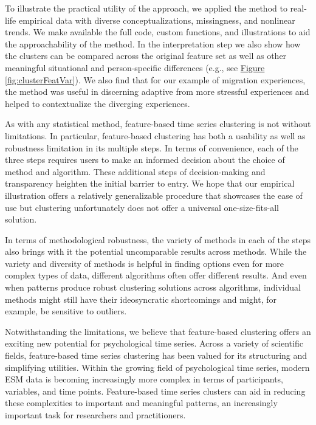 \documentclass[man, 12pt, a4paper, mask, floatsintext]{apa7}
\theoremstyle{break}
\theoremstyle{plain}
\newcommand{\fgrref}[2][]{\hyperref[#2]{Figure \ref*{#2}#1}}
\begin{document}
To illustrate the practical utility of the approach, we applied the method to real-life empirical data with diverse conceptualizations, missingness, and nonlinear trends. We make available the full code, custom functions, and illustrations to aid the approachability of the method. In the interpretation step we also show how the clusters can be compared across the original feature set as well as other meaningful situational and person-specific differences (e.g., see \fgrref{fig:clusterFeatVar}). We also find that for our example of migration experiences, the method was useful in discerning adaptive from more stressful experiences and helped to contextualize the diverging experiences.

As with any statistical method, feature-based time series clustering is not without limitations. 
In particular, feature-based clustering has both a usability as well as robustness limitation in its multiple steps. In terms of convenience, each of the three steps requires users to make an informed decision about the choice of method and algorithm. These additional steps of decision-making and transparency heighten the initial barrier to entry. We hope that our empirical illustration offers a relatively generalizable procedure that showcases the ease of use but clustering unfortunately does not offer a universal one-size-fits-all solution. 

In terms of methodological robustness, the variety of methods in each of the steps also brings with it the potential uncomparable results across methods. While the variety and diversity of methods is helpful in finding options even for more complex types of data, different algorithms often offer different results. And even when patterns produce robust clustering solutions across algorithms, individual methods might still have their ideosyncratic shortcomings and might, for example, be sensitive to outliers. 

Notwithstanding the limitations, we believe that feature-based clustering offers an exciting new potential for psychological time series. Across a variety of scientific fields, feature-based time series clustering has been valued for its structuring and simplifying utilities. Within the growing field of psychological time series, modern ESM data is becoming increasingly more complex in terms of participants, variables, and time points. Feature-based time series clusters can aid in reducing these complexities to important and meaningful patterns, an increasingly important task for researchers and practitioners. 
\end{document}
